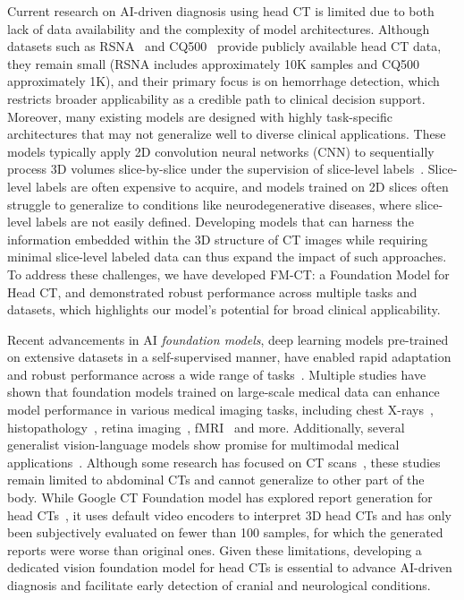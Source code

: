 \documentclass[fleqn,10pt]{wlscirep}
\begin{document}
Current research on AI-driven diagnosis using head CT is limited due to both lack of data availability and the complexity of model architectures. Although datasets such as RSNA~\cite{flanders_construction_2020} and CQ500~\cite{CQ500} provide publicly available head CT data, they remain small (RSNA includes approximately 10K samples and CQ500 approximately 1K), and their primary focus is on hemorrhage detection, which restricts broader applicability as a credible path to clinical decision support. Moreover, many existing models are designed with highly task-specific architectures that may not generalize well to diverse clinical applications. These models typically apply 2D convolution neural networks (CNN) to sequentially process 3D volumes slice-by-slice under the supervision of slice-level labels~\cite{wang_deep_2021,CQ500,yun_deep_2023}. %
Slice-level labels are often expensive to acquire, and models trained on 2D slices often struggle to generalize to conditions like neurodegenerative diseases, where slice-level labels are not easily defined. Developing models that can harness the information embedded within the 3D structure of CT images while requiring minimal slice-level labeled data can thus expand the impact of such approaches. To address these challenges, we have developed FM-CT: a Foundation Model for Head CT, and demonstrated robust performance across multiple tasks and datasets, which highlights our model's potential for broad clinical applicability.


Recent advancements in AI \textit{foundation models}, deep learning models pre-trained on extensive datasets in a self-supervised manner, have enabled rapid adaptation and robust performance across a wide range of tasks~\cite{radford2021learningtransferablevisualmodels,zhou2021ibot,oquab2023dinov2, rishi24foundation}. Multiple studies have shown that foundation models trained on large-scale medical data can enhance model performance in various medical imaging tasks, including chest X-rays~\cite{yao2024evaxfoundationmodelgeneral}, histopathology~\cite{wang_pathology_2024,huang_visuallanguage_2023,chen_towards_2024, Vorontsov2024},  retina imaging~\cite{zhou2023foundation}, fMRI~\cite{dong2024brainjepa} and more. Additionally, several generalist vision-language models show promise for multimodal medical applications~\cite{codella2024medimageinsight,yang2024advancingmultimodalmedicalcapabilities,zhang2024generalist}. Although some research has focused on CT scans~\cite{Tang_2022_CVPR,blankemeier2024merlinvisionlanguagefoundation,codella2024medimageinsight}, these studies remain limited to abdominal CTs and cannot generalize to other part of the body. While Google CT Foundation model has explored report generation for head CTs~\cite{yang2024advancingmultimodalmedicalcapabilities}, it uses default video encoders to interpret 3D head CTs and has only been subjectively evaluated on fewer than 100 samples, for which the generated reports were worse than original ones. Given these limitations, developing a dedicated vision foundation model for head CTs is essential to advance AI-driven diagnosis and facilitate early detection of cranial and neurological conditions.
\end{document}
